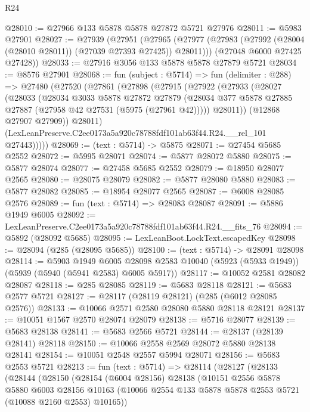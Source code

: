 \begin{lexlean}{R24}
\begin{coremodule}
@28010 := @27966 @133 @5878 @5878 @27872 @5721 @27976
@28011 := @5983 @27901
@28027 := @27939
    (@27951
      (@27965 (@27977 (@27983 (@27992 (@28004 (@28010 @28011)) (@27039 @27393 @27425)) @28011)))
      (@27048 @6000 @27425 @27428))
@28033 := @27916 @3056 @133 @5878 @5878 @27879 @5721
@28034 := @8576 @27901
@28068 := fun (subject : @5714) =>
  fun (delimiter : @288) =>
  @27480
    (@27520
      (@27861
        (@27898
          (@27915
            (@27922
              (@27933
                (@28027
                  (@28033
                    (@28034
                      @3033
                      @5878
                      @27872
                      @27879
                      (@28034 @377 @5878 @27885 @27887 (@27958 @42 @27531 (@5975 (@27961 @42)))))
                    @28011))
                (@12868 @27907 @27909))
              @28011)
            (LexLeanPreserve.C2ee0173a5a920c78788fdf101ab63f44.R24.__rel_101 @27443)))))
@28069 := (text : @5714) -> @5875
@28071 := @27454 @5685 @2552
@28072 := @5995 @28071
@28074 := @5877 @28072 @5880
@28075 := @5877 @28074
@28077 := @27458 @5685 @2552
@28079 := @18950 @28077 @2565
@28080 := @28075 @28079
@28082 := @5877 @28080 @5880
@28083 := @5877 @28082
@28085 := @18954 @28077 @2565
@28087 := @6008 @28085 @2576
@28089 := fun (text : @5714) => @28083 @28087
@28091 := @5886 @1949 @6005
@28092 := LexLeanPreserve.C2ee0173a5a920c78788fdf101ab63f44.R24.__fits_76
@28094 := @5892 (@28092 @5685)
@28095 := LexLeanBoot.LockText.escapedKey
@28098 := @28094 (@285 (@28095 @5685))
@28100 := (text : @5714) -> @28091 @28098
@28114 := @5903
    @1949
    @6005
    @28098
    @2583
    @10040
    (@5923 (@5933 @1949))
    (@5939 (@5940 (@5941 @2583) @6005 @5917))
@28117 := @10052 @2581 @28082 @28087
@28118 := @285 @28085
@28119 := @5683 @28118
@28121 := @5683 @2577 @5721
@28127 := @28117 (@28119 @28121) (@285 (@6012 @28085 @2576))
@28133 := @10066 @2571 @2580 @28080 @5880 @28118 @28121
@28137 := @10051 @1567 @2570 @28074 @28079
@28138 := @5716 @28077
@28139 := @5683 @28138
@28141 := @5683 @2566 @5721
@28144 := @28137 (@28139 @28141) @28118
@28150 := @10066 @2558 @2569 @28072 @5880 @28138 @28141
@28154 := @10051 @2548 @2557 @5994 @28071
@28156 := @5683 @2553 @5721
@28213 := fun (text : @5714) =>
  @28114
    (@28127
      (@28133
        (@28144
          (@28150
            (@28154
              (@6004 @28156)
              @28138
              (@10151
                @2556
                @5878
                @5880
                @6003
                @28156
                @10163
                (@10066 @2554 @133 @5878 @5878 @2553 @5721 (@10088 @2160 @2553) @10165))

\end{coremodule}
\end{lexlean}
